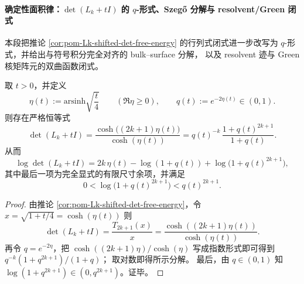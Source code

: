 \paragraph{确定性面积律：\texorpdfstring{\(\det(L_k+tI)\)}{det(L_k+tI)} 的 \(q\)-形式、Szeg\H{o} 分解与 resolvent/Green 闭式}
本段把推论 \ref{cor:pom-Lk-shifted-det-free-energy} 的行列式闭式进一步改写为 \(q\)-形式，并给出与符号积分完全对齐的 bulk--surface 分解，
以及 resolvent 迹与 Green 核矩阵元的双曲函数闭式。

\begin{corollary}\label{cor:pom-Lk-area-law-qform}
取 \(t>0\)，并定义
\[
\eta(t):=\mathrm{arsinh}\sqrt{\frac{t}{4}}\qquad(\Re\eta\ge 0),
\qquad
q(t):=e^{-2\eta(t)}\in(0,1).
\]
则存在严格恒等式
\[
\det(L_k+tI)=\frac{\cosh\!\bigl((2k+1)\eta(t)\bigr)}{\cosh(\eta(t))}
=q(t)^{-k}\,\frac{1+q(t)^{2k+1}}{1+q(t)}.
\]
从而
\[
\log\det(L_k+tI)=2k\,\eta(t)-\log(1+q(t))+\log\bigl(1+q(t)^{2k+1}\bigr),
\]
其中最后一项为完全显式的有限尺寸余项，并满足
\[
0<\log\bigl(1+q(t)^{2k+1}\bigr)<q(t)^{2k+1}.
\]
\end{corollary}
\begin{proof}
由推论 \ref{cor:pom-Lk-shifted-det-free-energy}，令 \(x=\sqrt{1+t/4}=\cosh(\eta(t))\) 则
\[
\det(L_k+tI)=\frac{T_{2k+1}(x)}{x}=\frac{\cosh((2k+1)\eta(t))}{\cosh(\eta(t))}.
\]
再令 \(q=e^{-2\eta}\)，把 \(\cosh((2k+1)\eta)/\cosh(\eta)\) 写成指数形式即可得到
\(
q^{-k}(1+q^{2k+1})/(1+q)
\)；
取对数即得所示分解。
最后，由 \(q\in(0,1)\) 知 \(\log(1+q^{2k+1})\in(0,q^{2k+1})\)。证毕。
\end{proof}

